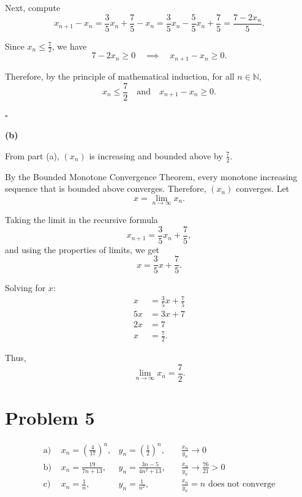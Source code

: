 \documentclass[12pt]{article}
\begin{document}
Next, compute
\[
	x_{n+1} - x_n = \frac{3}{5}x_n + \frac{7}{5} - x_n = \frac{3}{5}x_n - \frac{5}{5}x_n + \frac{7}{5} = \frac{7 - 2x_n}{5}.
\]

Since \(x_n \le \frac{7}{2}\), we have
\[
	7 - 2x_n \ge 0 \quad \implies \quad x_{n+1} - x_n \ge 0.
\]

Therefore, by the principle of mathematical induction, for all $n \in \mathbb{N}$,
\[
	x_n \le \frac{7}{2} \quad \text{and} \quad x_{n+1} - x_n \ge 0.
\]

\hfill \(\square\)

\bigskip

\textbf{(b)}

From part (a), $(x_n)$ is increasing and bounded above by $\frac{7}{2}$.

By the Bounded Monotone Convergence Theorem, every monotone increasing sequence that is bounded above converges. Therefore, $(x_n)$ converges. Let
\[
	x = \lim_{n \to \infty} x_n.
\]

Taking the limit in the recursive formula
\[
	x_{n+1} = \frac{3}{5}x_n + \frac{7}{5},
\]
and using the properties of limits, we get
\[
	x = \frac{3}{5}x + \frac{7}{5}.
\]

Solving for \(x\):
\begin{align*}
	x  & = \frac{3}{5}x + \frac{7}{5} \\
	5x & = 3x + 7                     \\
	2x & = 7                          \\
	x  & = \frac{7}{2}.
\end{align*}

Thus,
\[
	\lim_{n \to \infty} x_n = \frac{7}{2}.
\]

\section*{Problem 5}

\[
	\begin{aligned}
		\text{a) } & x_n = \left(\frac{4}{17}\right)^n, & y_n = \left(\frac{1}{2}\right)^n, & \quad \frac{x_n}{y_n} \to 0                         \\
		\text{b) } & x_n = \frac{19}{7n+13},            & y_n = \frac{3n-5}{4n^2 + 13},     & \quad \frac{x_n}{y_n} \to \frac{76}{21} > 0         \\
		\text{c) } & x_n = \frac{1}{n},                 & y_n = \frac{1}{n^2},              & \quad \frac{x_n}{y_n} = n \text{ does not converge}
	\end{aligned}
\]
\end{document}
